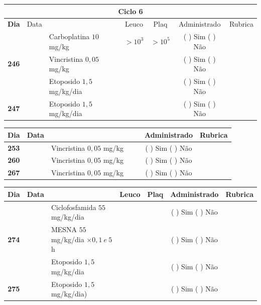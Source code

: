 \documentclass[11pt,a4paper,oldfontcommands]{memoir}
\begin{document}
\begin{center}
\begin{longtable}{p{1cm}c|p{5cm}|p{1.5cm}p{1.5cm}|c|c}
	\hline
	\multicolumn{7}{c}{Ciclo 6} \\
	\hline
	\multicolumn{1}{c|}{\multirow{1}{*}{\textbf{Dia}}}&{Data}&{}&\multicolumn{1}{c|}{Leuco}&\multicolumn{1}{c|}{Plaq}&{Administrado}&{Rubrica} \\
    \hline
    \multicolumn{1}{c|}{\multirow{3}{*}{\textbf{246}}}&\multirow{2}{*}{}&{Carboplatina \(10\) mg/kg}&\multicolumn{1}{c|}{\(>10^3\)}&\multicolumn{1}{c|}{\(>10^5\)}&{(  ) Sim (  ) Não}&\\
    \cline{4-5}
    \multicolumn{1}{c|}{}&&{Vincristina \(0,05\) mg/kg}&\multicolumn{1}{c|}{}&&{(  ) Sim (  ) Não}&\\
    \cline{4-5}
    \multicolumn{1}{c|}{}&\multirow{1}{*}{}&{Etoposido \(1,5\) mg/kg/dia}&{}&&{(  ) Sim (  ) Não}&\\
    \cline{1-3}\cline{6-6}
    \multicolumn{1}{c|}{\textbf{247}}&\multirow{1}{*}{}&{Etoposido \(1,5\) mg/kg/dia}&{}&&{(  ) Sim (  ) Não}&\\
    \hline
\end{longtable}
\begin{longtable}{p{1cm}c|p{4cm}|p{2cm}p{2cm}|c|c}
	\hline
	\multicolumn{1}{c|}{\multirow{1}{*}{\textbf{Dia}}}&{Data}&{}&{}&&{Administrado}&{Rubrica} \\
    \hline
    \multicolumn{1}{c|}{\textbf{253}}&&{Vincristina \(0,05\) mg/kg}&\multicolumn{1}{c}{}&&{(  ) Sim (  ) Não}&\\
    \hline
    \multicolumn{1}{c|}{\textbf{260}}&&{Vincristina \(0,05\) mg/kg}&\multicolumn{1}{c}{}&&{(  ) Sim (  ) Não}&\\
    \hline
    \multicolumn{1}{c|}{\textbf{267}}&&{Vincristina \(0,05\) mg/kg}&\multicolumn{1}{c}{}&&{(  ) Sim (  ) Não}&\\
    \hline
\end{longtable}

\begin{longtable}{p{1cm}c|p{5cm}|p{1.5cm}p{1.5cm}|c|c}
	\hline
	\multicolumn{1}{c|}{\multirow{1}{*}{\textbf{Dia}}}&{Data}&{}&\multicolumn{1}{c|}{Leuco}&\multicolumn{1}{c|}{Plaq}&{Administrado}&{Rubrica} \\
    \hline
    \multicolumn{1}{c|}{\multirow{3}{*}{\textbf{274}}}&&{Ciclofosfamida \(55\) mg/kg/dia}&\multicolumn{1}{c|}{}&&{(  ) Sim (  ) Não}&\\
    \cline{4-5}
    \multicolumn{1}{c|}{}&&{MESNA \(55\) mg/kg/dia \(\times 0,1 \:e\: 5\)h}&&&{(  ) Sim (  ) Não}&\\
    \multicolumn{1}{c|}{}&&{Etoposido \(1,5\) mg/kg/dia}&&&{(  ) Sim (  ) Não}&\\
    \hline
    \multicolumn{1}{c|}{\multirow{1}{*}{\textbf{275}}}&&{Etoposido \(1,5\) mg/kg/dia)}&{}&&{(  ) Sim (  ) Não}&\\
    \hline
\end{longtable}
\end{center}
\end{document}
